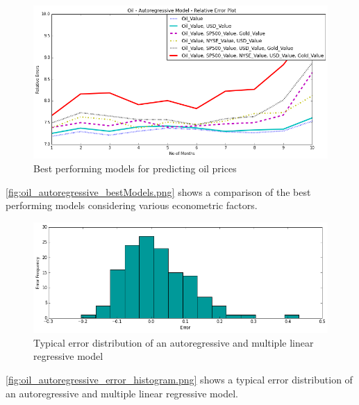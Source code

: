 \documentclass[runningheads]{llncs}
\begin{document}
\begin{figure}
\centering
\includegraphics[width=\textwidth]{oil_autoregressive_bestModels.png}
\caption{Best performing models for predicting oil prices}
\label{fig:oil_autoregressive_bestModels.png}
\end{figure}

\autoref{fig:oil_autoregressive_bestModels.png} shows a comparison of the best performing models considering various econometric factors.


\begin{figure}
\centering
\includegraphics[width=\textwidth]{oil_autoregressive_error_histogram.png}
\caption{Typical error distribution of an autoregressive and multiple linear regressive model}
\label{fig:oil_autoregressive_error_histogram.png}
\end{figure}

\autoref{fig:oil_autoregressive_error_histogram.png} shows a typical error distribution of an autoregressive and multiple linear regressive model.
\end{document}

